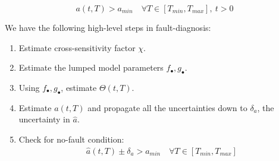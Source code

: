 $$ a(t, T) > a_{min} \quad \forall T \in [T_{min}, T_{max}], \: t > 0$$

\bigskip

We have the following high-level steps in fault-diagnosis:
\begin{enumerate}
    \item Estimate cross-sensitivity factor $\chi$.
    \item Estimate the lumped model parameters $f_{\bullet}, g_{\bullet}$.
    \item Using $f_{\bullet}, g_{\bullet}$, estimate $\Theta(t, T)$.
\item Estimate $a(t, T)$ and propagate all the uncertainties down to
$\delta_{a}$, the uncertainty in $\hat a$.
    \item Check for no-fault condition:
\begin{align*}
    \hat a(t, T) \pm \delta_a > a_{min} \quad \forall T \in [T_{min}, T_{max}]
\end{align*}
\end{enumerate}
